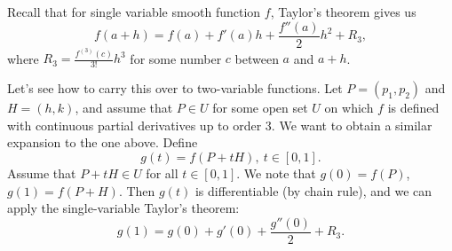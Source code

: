 \documentclass{article}
\begin{document}
Recall that for single variable smooth function $f$, Taylor's theorem gives us 
\[f(a+h) = f(a) + f'(a)h + \frac{f''(a)}{2} h^2 + R_3,\]
where $R_3 = \frac{f^{(3)}(c)}{3!}h^3$ for some number $c$ between $a$ and $a+h$.

Let's see how to carry this over to two-variable functions. Let $P=(p_1,p_2)$ and $H=(h,k)$, and assume
that $P \in U$ for some open set $U$ on which $f$ is defined with continuous partial derivatives up to order $3$.
We want to obtain a similar expansion to the one above. Define 
\[g(t) = f(P+tH),\ t \in [0,1].\]
Assume that $P+tH \in U$ for all $t \in [0,1]$. We note that $g(0) = f(P)$, $g(1) = f(P+H)$. 
Then $g(t)$ is differentiable (by chain rule), and we can apply the single-variable Taylor's theorem:
\[g(1) = g(0) + g'(0) + \frac{g''(0)}{2}+R_3.\]
\end{document}
